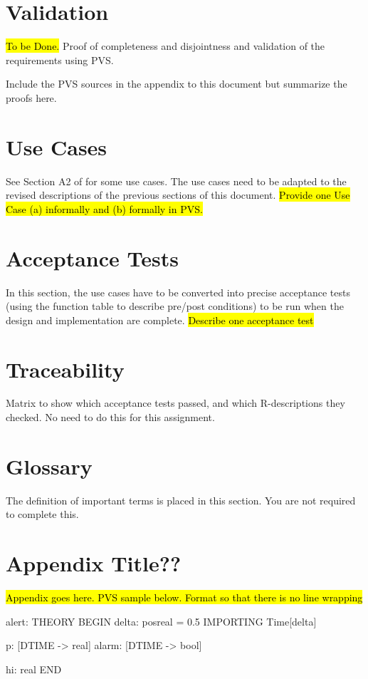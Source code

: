 \documentclass[fontsize=12pt,paper=letter,twoside]{scrartcl}
\begin{document}
\newpage
\section{Validation}
\hl{To be Done.} 
Proof of completeness and disjointness and validation of the requirements using PVS.

Include the PVS sources in the appendix to this document but summarize the proofs here.\

\newpage
\section{Use Cases}

See Section A2 of \cite{REMH} for some use cases. The use cases need to be adapted to the revised descriptions of the previous sections of this document.
\hl{Provide one Use Case (a) informally and (b) formally in PVS.}

\newpage
\section{Acceptance Tests}

In this section, the use cases have to be converted into precise acceptance tests (using the function table to describe pre/post conditions) to be run when the design and implementation are complete. \hl{Describe one acceptance test}

\newpage
\section{Traceability}

Matrix to show which acceptance tests passed, and which R-descriptions they checked. No need to do this for this assignment. 


\section{Glossary}

The definition of important terms is placed in this section. You are not required to complete this.



\newpage
\appendix

\section{Appendix Title??}
\hl{Appendix goes here. PVS sample below. Format so that there is no line wrapping}

\begin{pvs}
alert: THEORY
BEGIN
  delta: posreal = 0.5 %
  IMPORTING Time[delta]

  p:     [DTIME -> real]  %
  alarm: [DTIME -> bool]

  hi: real
END 	
\end{pvs}
\end{document}
